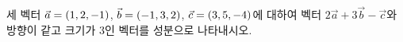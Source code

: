 세 벡터 $\vec{a}=(1{,}\mkern3mu\mathopen{}2{,}\mkern3mu\mathopen{}-1)$, $\vec{b}=(-1{,}\mkern3mu\mathopen{}3{,}\mkern3mu\mathopen{}2)$, $\vec{c}=(3{,}\mkern3mu\mathopen{}5{,}\mkern3mu\mathopen{}-4)$에 대하여 벡터 $2\vec{a}+3\vec{b}-\vec{c}$와 방향이 같고 크기가 $3$인 벡터를 성분으로 나타내시오.
